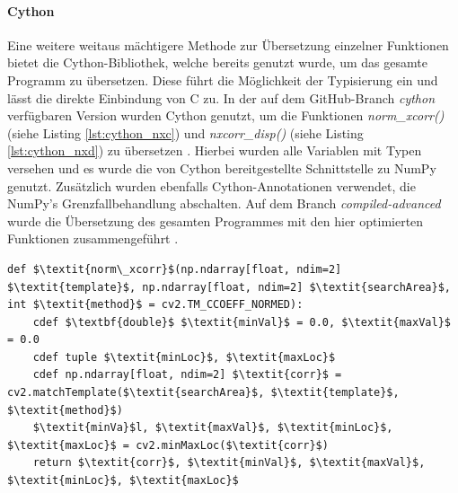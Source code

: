 \paragraph{Cython}

Eine weitere weitaus mächtigere Methode zur Übersetzung einzelner Funktionen bietet die Cython-Bibliothek, welche bereits genutzt wurde, um das gesamte Programm zu übersetzen. Diese führt die Möglichkeit der Typisierung ein und lässt die direkte Einbindung von C zu. In der auf dem GitHub-Branch \textit{cython} verfügbaren Version wurden Cython genutzt, um die Funktionen \textit{norm\_xcorr()} (siehe Listing \ref{lst:cython_nxc}) und \textit{nxcorr\_disp()} (siehe Listing \ref{lst:cython_nxd}) zu übersetzen \cite{Coj17}. Hierbei wurden alle Variablen mit Typen versehen und es wurde die von Cython bereitgestellte Schnittstelle zu NumPy genutzt. Zusätzlich wurden ebenfalls Cython-Annotationen verwendet, die NumPy's Grenzfallbehandlung abschalten. Auf dem Branch \textit{compiled-advanced} wurde die Übersetzung des gesamten Programmes mit den hier optimierten Funktionen zusammengeführt \cite{Coj17}. 

\begin{lstlisting}[caption={Die in Cython optimierte Funktion norm\_xcorr()}, label={lst:cython_nxc}]
def $\textit{norm\_xcorr}$(np.ndarray[float, ndim=2] $\textit{template}$, np.ndarray[float, ndim=2] $\textit{searchArea}$, int $\textit{method}$ = cv2.TM_CCOEFF_NORMED):
	cdef $\textbf{double}$ $\textit{minVal}$ = 0.0, $\textit{maxVal}$ = 0.0
	cdef tuple $\textit{minLoc}$, $\textit{maxLoc}$
	cdef np.ndarray[float, ndim=2] $\textit{corr}$ = cv2.matchTemplate($\textit{searchArea}$, $\textit{template}$, $\textit{method}$)
	$\textit{minVa}$l, $\textit{maxVal}$, $\textit{minLoc}$, $\textit{maxLoc}$ = cv2.minMaxLoc($\textit{corr}$)
	return $\textit{corr}$, $\textit{minVal}$, $\textit{maxVal}$, $\textit{minLoc}$, $\textit{maxLoc}$
\end{lstlisting}

